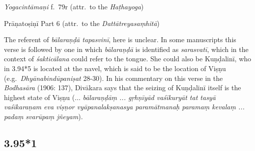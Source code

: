 \begin{ekdosis}
\begin{testimonia}[hp03_095]
\emph{Yogacintāmaṇi} f.~79r (attr.~to the \emph{Haṭhayoga})
\begin{versinnote}
\end{versinnote}


Prāṇatoṣiṇī Part 6 (attr.~to the \emph{Dattātreyasaṃhitā})
\begin{versinnote}
\end{versinnote}


\end{testimonia}

\begin{philcomm}[hp03_095]
The referent of \emph{bālaraṇḍā tapasvinī}, here is unclear. In some manuscripts this verse is followed by one in which \emph{bālaraṇḍā} is identified as \emph{sarasvatī}, which in the context of \emph{śakticālana} could refer to the tongue. She could also be Kuṇḍalinī, who in 3.94*5 is located at the navel, which is said to be the location of Viṣṇu (e.g.~\emph{Dhyāna\-bindū\-paniṣat} 28-30). In his commentary on this verse in the \emph{Bodhasāra} (1906: 137), Divākara says that the seizing of Kuṇḍalinī itself is the highest state of Viṣṇu (... \emph{bālaraṇḍāṃ ... gṛhṇīyād vaśīkuryāt tat tasyā vaśīkaraṇam eva viṣṇor vyāpana\-lakṣa\-nasya paramā\-tmanaḥ paramaṃ kevalaṃ ... padaṃ svarūpaṃ jñeyam}).

\end{philcomm}

\subsection*{3.95*1}


\end{ekdosis}
